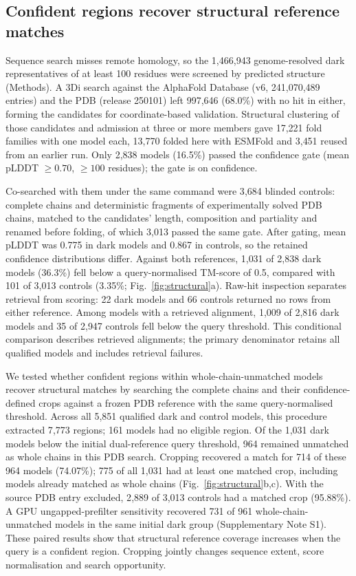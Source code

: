 \documentclass[11pt]{article}
\begin{document}
\subsection*{Confident regions recover structural reference matches}

Sequence search misses remote homology, so the 1{,}466{,}943 genome-resolved dark representatives
of at least 100 residues were screened by predicted structure (Methods). A 3Di search against the
AlphaFold Database (v6, 241{,}070{,}489 entries) and the PDB (release 250101) left 997{,}646
(68.0\%) with no hit in either, forming the candidates for coordinate-based validation. Structural clustering of those
candidates and admission at three or more members gave 17{,}221 fold families with one model each,
13{,}770 folded here with ESMFold and 3{,}451 reused from an earlier run. Only 2{,}838 models
(16.5\%) passed the confidence gate (mean pLDDT $\geq 0.70$, $\geq 100$ residues); the gate is on
confidence.

Co-searched with them under the same command were 3{,}684 blinded controls: complete chains and
deterministic fragments of experimentally solved PDB chains, matched to the candidates' length,
composition and partiality and renamed before folding, of which 3{,}013 passed the same gate. After gating, mean pLDDT was 0.775 in dark models and 0.867 in controls, so the retained confidence distributions differ.
Against both references, 1{,}031 of 2{,}838 dark models (36.3\%) fell below a query-normalised
TM-score of 0.5, compared with 101 of 3{,}013 controls (3.35\%; Fig.~\ref{fig:structural}a).
Raw-hit inspection separates retrieval from scoring: 22 dark models and 66 controls returned
no rows from either reference. Among models with a retrieved alignment, 1{,}009 of 2{,}816 dark
models and 35 of 2{,}947 controls fell below the query threshold. This conditional comparison describes retrieved alignments; the primary denominator retains
all qualified models and includes retrieval failures.

We tested whether confident regions within whole-chain-unmatched models recover structural
matches by searching the complete chains and their confidence-defined crops against a frozen
PDB reference with the same query-normalised threshold. Across all 5{,}851 qualified dark and
control models, this procedure extracted 7{,}773 regions; 161 models had no eligible region.
Of the 1{,}031 dark models below the initial dual-reference query threshold, 964 remained
unmatched as whole chains in this PDB search. Cropping recovered a match for 714 of these
964 models (74.07\%); 775 of all 1{,}031 had at least one matched crop, including models already
matched as whole chains (Fig.~\ref{fig:structural}b,c). With the source PDB entry excluded,
2{,}889 of 3{,}013 controls had a matched crop (95.88\%). A GPU ungapped-prefilter sensitivity
recovered 731 of 961 whole-chain-unmatched models in the same initial dark group
(Supplementary Note S1). These paired results show that structural reference coverage increases
when the query is a confident region. Cropping jointly changes sequence extent, score
normalisation and search opportunity.
\end{document}

